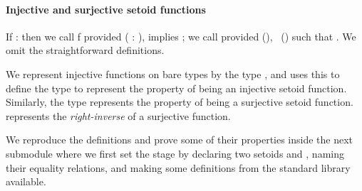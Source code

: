 \paragraph*{Injective and surjective setoid functions}
If  :   
then we call \ab f  provided
 (  \as : ),       
implies   ; we call   provided
 (), ~() such that     .
\ifshort
We omit the straightforward \agda definitions.
\else

We represent injective functions on bare types by the
type , and uses this to define the  type to represent
the property of being an injective setoid function. Similarly, the type 
represents the property of being a surjective setoid function.  represents the \emph{right-inverse} of a surjective function.

We reproduce the definitions and prove some of their properties
inside the next submodule where we first set the stage by declaring two
setoids  and , naming their equality relations, and making some
definitions from the standard library available.

